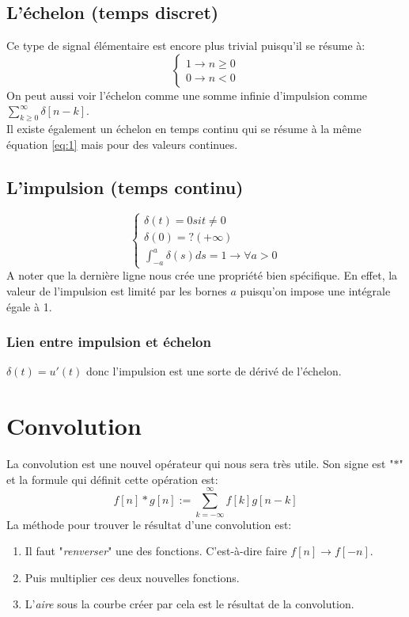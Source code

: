 \documentclass{report}
\begin{document}
\subsection{L'échelon (temps discret)}
Ce type de signal élémentaire est encore plus trivial puisqu'il se résume à:
\begin{equation}\label{eq:1}
\begin{cases}
1 \rightarrow n \geq 0 \\
0 \rightarrow n < 0
\end{cases}
\end{equation}
On peut aussi voir l'échelon comme une somme infinie d'impulsion comme $\sum_{k \geq 0}^{\infty} \delta[n-k]$.\\
Il existe également un échelon en temps continu qui se résume à la même équation \ref{eq:1} mais pour des valeurs continues.

\subsection{L'impulsion (temps continu)}
\begin{equation}
\begin{cases}
\delta (t) = 0 si t \neq 0\\
\delta (0) = ?(+\infty)\\
\int_{-a}^a \delta (s) ds = 1 \rightarrow \forall a > 0
\end{cases}
\end{equation}
A noter que la dernière ligne nous crée une propriété bien spécifique. En effet, la valeur de l'impulsion est limité par les bornes $a$ puisqu'on impose une intégrale égale à 1.

\subsubsection{Lien entre impulsion et échelon}
$\delta (t) = u'(t)$ donc l'impulsion est une sorte de dérivé de l'échelon.

\section{Convolution}
La convolution est une nouvel opérateur qui nous sera très utile. Son signe est "$\ast$" et la formule qui définit cette opération est:
\begin{equation}
f[n] \ast g[n] := \sum_{k=-\infty}^{\infty} f[k]g[n-k] 
\end{equation}
La méthode pour trouver le résultat d'une convolution est:
\begin{enumerate}
\item Il faut "\textit{renverser}" une des fonctions. C'est-à-dire faire $f[n] \rightarrow f[-n]$.
\item Puis multiplier ces deux nouvelles fonctions.
\item L'\textit{aire} sous la courbe créer par cela est le résultat de la convolution.
\end{enumerate}
\end{document}
